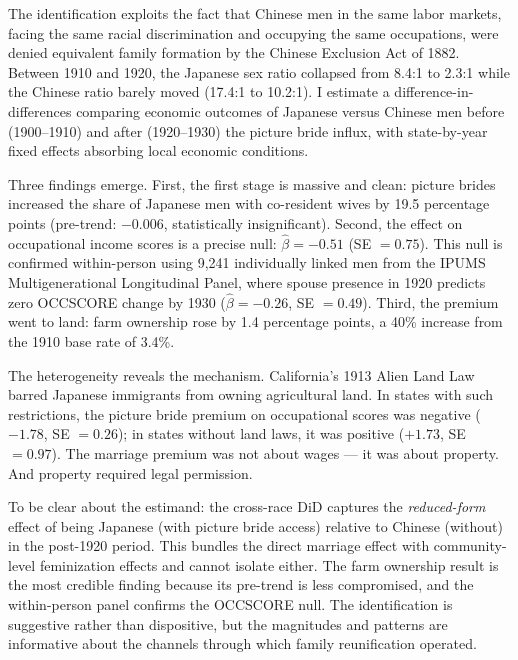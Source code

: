 \documentclass[12pt]{article}
\begin{document}
The identification exploits the fact that Chinese men in the same labor markets, facing the same racial discrimination and occupying the same occupations, were denied equivalent family formation by the Chinese Exclusion Act of 1882. Between 1910 and 1920, the Japanese sex ratio collapsed from 8.4:1 to 2.3:1 while the Chinese ratio barely moved (17.4:1 to 10.2:1). I estimate a difference-in-differences comparing economic outcomes of Japanese versus Chinese men before (1900--1910) and after (1920--1930) the picture bride influx, with state-by-year fixed effects absorbing local economic conditions.

Three findings emerge. First, the first stage is massive and clean: picture brides increased the share of Japanese men with co-resident wives by 19.5 percentage points (pre-trend: $-0.006$, statistically insignificant). Second, the effect on occupational income scores is a precise null: $\hat{\beta} = -0.51$ (SE $= 0.75$). This null is confirmed within-person using 9,241 individually linked men from the IPUMS Multigenerational Longitudinal Panel, where spouse presence in 1920 predicts zero OCCSCORE change by 1930 ($\hat{\beta} = -0.26$, SE $= 0.49$). Third, the premium went to land: farm ownership rose by 1.4 percentage points, a 40\% increase from the 1910 base rate of 3.4\%.

The heterogeneity reveals the mechanism. California's 1913 Alien Land Law barred Japanese immigrants from owning agricultural land. In states with such restrictions, the picture bride premium on occupational scores was negative ($-1.78$, SE $= 0.26$); in states without land laws, it was positive ($+1.73$, SE $= 0.97$). The marriage premium was not about wages --- it was about property. And property required legal permission.

To be clear about the estimand: the cross-race DiD captures the \textit{reduced-form} effect of being Japanese (with picture bride access) relative to Chinese (without) in the post-1920 period. This bundles the direct marriage effect with community-level feminization effects and cannot isolate either. The farm ownership result is the most credible finding because its pre-trend is less compromised, and the within-person panel confirms the OCCSCORE null. The identification is suggestive rather than dispositive, but the magnitudes and patterns are informative about the channels through which family reunification operated.
\end{document}
